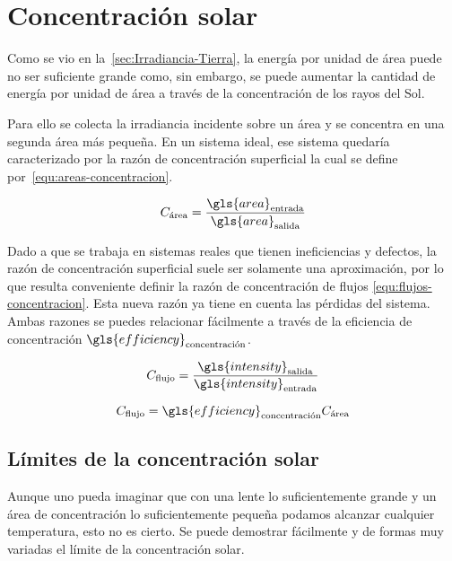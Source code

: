 \section{Concentración solar}

	Como se vio en la~\cref{sec:Irradiancia-Tierra}, la energía por unidad de área puede no ser suficiente grande como, sin embargo, se puede aumentar la cantidad de energía por unidad de área a través de la concentración de los rayos del Sol.
	
	Para ello se colecta la irradiancia incidente sobre un área y se concentra en una segunda área más pequeña. En un sistema ideal, ese sistema quedaría caracterizado por la razón de concentración superficial la cual se define por~\eqref{equ:areas-concentracion}.
	
	\begin{equation}\label{equ:areas-concentracion}
		C_{\text{área}} = \dfrac{\gls{area}_{\text{entrada}}}{\gls{area}_{\text{salida}}}
	\end{equation}
	
	Dado a que se trabaja en sistemas reales que tienen ineficiencias y defectos, la razón de concentración superficial suele ser solamente una aproximación, por lo que resulta conveniente definir la razón de concentración de flujos \eqref{equ:flujos-concentracion}. Esta nueva razón ya tiene en cuenta las pérdidas del sistema. Ambas razones se puedes relacionar fácilmente a través de la eficiencia de concentración $\gls{efficiency}_{\text{concentración}}$.
	
	\begin{equation}\label{equ:flujos-concentracion}
		C_{\text{flujo}} = \dfrac{\gls{intensity}_{\text{salida}}}{\gls{intensity}_{\text{entrada}}}
	\end{equation}
	
	\begin{equation}\label{equ:relacion-concentracion-flujo-area}
		C_{\text{flujo}} = \gls{efficiency}_{\text{concentración}} C_{\text{área}}
	\end{equation}
	
	\subsection{Límites de la concentración solar}
		
		Aunque uno pueda imaginar que con una lente lo suficientemente grande y un área de concentración lo suficientemente pequeña podamos alcanzar cualquier temperatura, esto no es cierto. Se puede demostrar fácilmente y de formas muy variadas el límite de la concentración solar.
		
